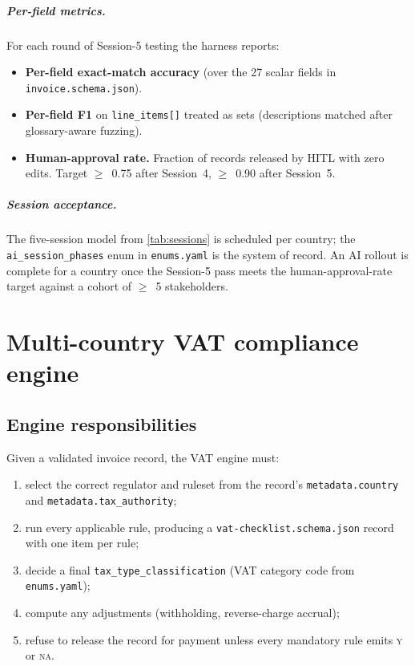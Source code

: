 \documentclass[11pt,a4paper,twoside]{report}
\begin{document}
\paragraph{Per-field metrics.} For each round of Session-5 testing the
harness reports:

\begin{itemize}
\item \textbf{Per-field exact-match accuracy} (over the 27 scalar
fields in \texttt{invoice.schema.json}).
\item \textbf{Per-field F1} on \texttt{line\_items[]} treated as sets
(descriptions matched after glossary-aware fuzzing).
\item \textbf{Human-approval rate.} Fraction of records released by
HITL with zero edits. Target $\geq$~0.75 after Session~4,
$\geq$~0.90 after Session~5.
\end{itemize}

\paragraph{Session acceptance.} The five-session model from
\cref{tab:sessions} is scheduled per country; the
\texttt{ai\_session\_phases} enum in \texttt{enums.yaml} is the system
of record. An AI rollout is complete for a country once the
Session-5 pass meets the human-approval-rate target against a cohort
of $\geq$~5 stakeholders.
\chapter{Multi-country VAT compliance engine}\label{ch:vat}

\section{Engine responsibilities}

Given a validated invoice record, the VAT engine must:

\begin{enumerate}
\item select the correct regulator and ruleset from the record's
\texttt{metadata.country} and \texttt{metadata.tax\_authority};
\item run every applicable rule, producing a
\texttt{vat-checklist.schema.json} record with one item per rule;
\item decide a final \texttt{tax\_type\_classification} (VAT category
code from \texttt{enums.yaml});
\item compute any adjustments (withholding, reverse-charge accrual);
\item refuse to release the record for payment unless every
mandatory rule emits \textsc{y} or \textsc{na}.
\end{enumerate}
\end{document}
